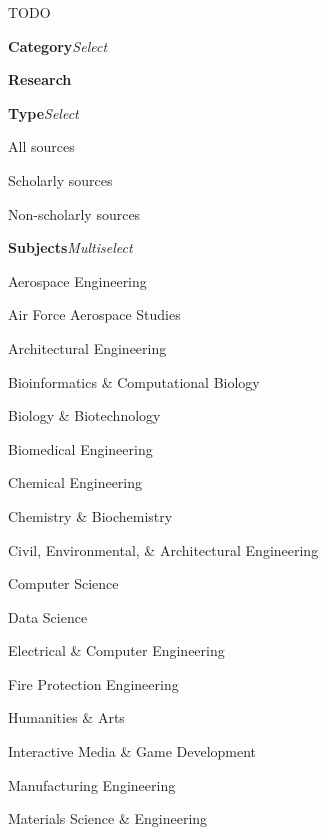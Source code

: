 TODO

\begin{CompactItemize}[leftmargin = *]
    \item \textbf{Category}\quad\textit{Select}
    \begin{CompactItemize}
        \item \textbf{Research}
        \begin{CompactItemize}
            \item \textbf{Type}\quad\textit{Select}
            \begin{CompactItemize}
                \item All sources
                \item Scholarly sources
                \item Non-scholarly sources
            \end{CompactItemize}
            \item \textbf{Subjects}\quad\textit{Multiselect}
            \begin{CompactItemize}
                \item Aerospace Engineering
                \item Air Force Aerospace Studies
                \item Architectural Engineering
                \item Bioinformatics \& Computational Biology
                \item Biology \& Biotechnology
                \item Biomedical Engineering
                \item Chemical Engineering
                \item Chemistry \& Biochemistry
                \item Civil, Environmental, \& Architectural Engineering
                \item Computer Science
                \item Data Science
                \item Electrical \& Computer Engineering
                \item Fire Protection Engineering
                \item Humanities \& Arts
                \item Interactive Media \& Game Development
                \item Manufacturing Engineering
                \item Materials Science \& Engineering

\end{CompactItemize}
\end{CompactItemize}
\end{CompactItemize}
\end{CompactItemize}
